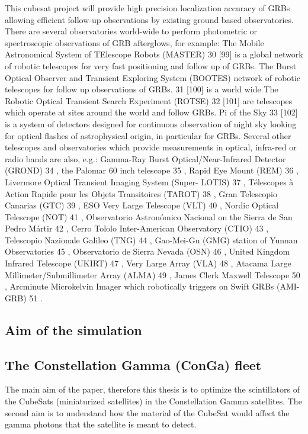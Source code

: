 \documentclass[12pt, a4paper,titlepage]{article}
\numberwithin{equation}{section}
\numberwithin{figure}{section}
\begin{document}
This cubesat project will provide high precision localization accuracy of GRBs allowing efficient follow-up observations by existing ground based observatories. There are several observatories world-wide to perform photometric or spectroscopic observations of GRB afterglows, for example:
The Mobile Astronomical System of TElescope Robots (MASTER) 30 [99] is a global network of robotic telescopes for very fast positioning and follow up of GRBs.
The Burst Optical Observer and Transient Exploring System (BOOTES) network of robotic telescopes for follow up observations of GRBs. 31 [100] is a world wide The Robotic Optical Transient Search Experiment (ROTSE) 32 [101] are telescopes which operate at
sites around the world and follow GRBs.
Pi of the Sky 33 [102] is a system of detectors designed for continuous observation of night sky looking for optical flashes of astrophysical origin, in particular for GRBs.
Several other telescopes and observatories which provide measurements in optical, infra-red or radio bands are also, e.g.: Gamma-Ray Burst Optical/Near-Infrared Detector (GROND) 34 , the Palomar 60 inch telescope 35 , Rapid Eye Mount (REM) 36 , Livermore Optical Transient Imaging System (Super- LOTIS) 37 , Télescopes à Action Rapide pour les Objets Transitoires (TAROT) 38 , Gran Telescopio Canarias (GTC) 39 , ESO Very Large Telescope (VLT) 40 , Nordic Optical Telescope (NOT) 41 , Observatorio Astronómico Nacional on the Sierra de San Pedro Mártir 42 , Cerro Tololo Inter-American Observatory (CTIO) 43 , Telescopio Nazionale Galileo (TNG) 44 , Gao-Mei-Gu (GMG) station of Yunnan Observatories 45 , Observatorio de Sierra Nevada (OSN) 46 , United Kingdom Infrared Telescope (UKIRT) 47 , Very Large Array (VLA) 48 , Atacama Large Millimeter/Submillimeter Array (ALMA) 49 , James Clerk Maxwell Telescope 50 , Arcminute Microkelvin Imager which robotically triggers on Swift GRBs (AMI-GRB) 51 .

\subsection{Aim of the simulation}

\subsection{The Constellation Gamma (ConGa) fleet}


The main aim of the paper, therefore this thesis is to optimize the scintillators of the CubeSats (miniaturized satellites) in the Constellation Gamma satellites. The second aim is to understand how the material of the CubeSat would affect the gamma photons that the satellite is meant to detect.
\end{document}

